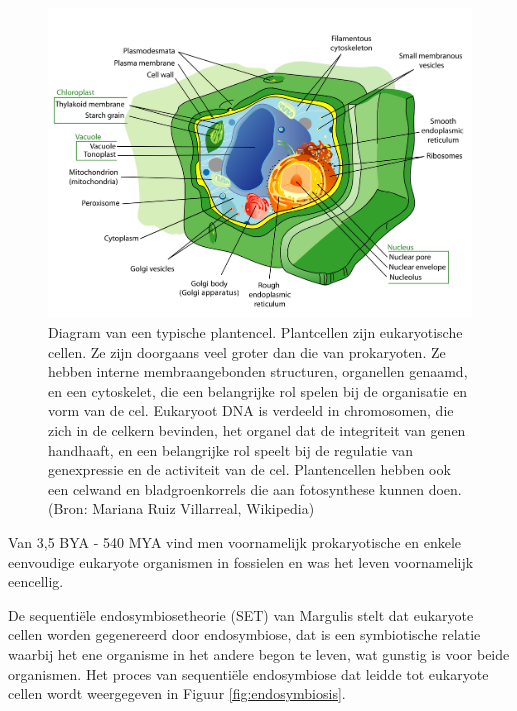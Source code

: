 \documentclass[
  11pt,
]{book}
\begin{document}
\begin{figure}

{\centering \includegraphics[width=0.5\linewidth]{./figs/plantCell} 

}

\caption{Diagram van een typische plantencel. Plantcellen zijn eukaryotische cellen. Ze zijn doorgaans veel groter dan die van prokaryoten. Ze hebben interne membraangebonden structuren, organellen genaamd, en een cytoskelet, die een belangrijke rol spelen bij de organisatie en vorm van de cel. Eukaryoot DNA is verdeeld in chromosomen, die zich in de celkern bevinden, het organel dat de integriteit van genen handhaaft, en een belangrijke rol speelt bij de regulatie van genexpressie en de activiteit van de cel. Plantencellen hebben ook een celwand en bladgroenkorrels die aan fotosynthese kunnen doen. (Bron:  Mariana Ruiz Villarreal, Wikipedia)}\label{fig:plantCell}
\end{figure}

Van 3,5 BYA - 540 MYA vind men voornamelijk prokaryotische en enkele eenvoudige eukaryote organismen in fossielen en was het leven voornamelijk eencellig.

De sequentiële endosymbiosetheorie (SET) van Margulis stelt dat eukaryote cellen worden gegenereerd door endosymbiose, dat is een symbiotische relatie waarbij het ene organisme in het andere begon te leven, wat gunstig is voor beide organismen. Het proces van sequentiële endosymbiose dat leidde tot eukaryote cellen wordt weergegeven in Figuur \ref{fig:endosymbiosis}.
\end{document}
